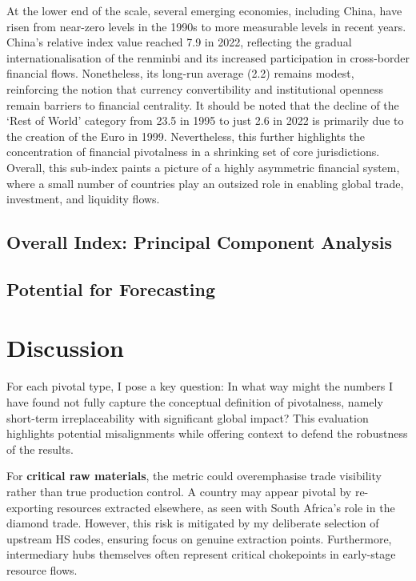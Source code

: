 \documentclass[11pt]{article}
\begin{document}
At the lower end of the scale, several emerging economies, including China, have risen from near-zero levels in the 1990s to more measurable levels in recent years. China’s relative index value reached 7.9 in 2022, reflecting the gradual internationalisation of the renminbi and its increased participation in cross-border financial flows. Nonetheless, its long-run average (2.2) remains modest, reinforcing the notion that currency convertibility and institutional openness remain barriers to financial centrality. It should be noted that the decline of the ‘Rest of World’ category from 23.5 in 1995 to just 2.6 in 2022 is primarily due to the creation of the Euro in 1999. Nevertheless, this further highlights the concentration of financial pivotalness in a shrinking set of core jurisdictions. Overall, this sub-index paints a picture of a highly asymmetric financial system, where a small number of countries play an outsized role in enabling global trade, investment, and liquidity flows.

\subsection{Overall Index: Principal Component Analysis}

\subsection{Potential for Forecasting}

\section{Discussion} 
\label{sec:evaluation}

For each pivotal type, I pose a key question: In what way might the numbers I have found not fully capture the conceptual definition of pivotalness, namely short-term irreplaceability with significant global impact? This evaluation highlights potential misalignments while offering context to defend the robustness of the results.

For \textbf{critical raw materials}, the metric could overemphasise trade visibility rather than true production control. A country may appear pivotal by re-exporting resources extracted elsewhere, as seen with South Africa’s role in the diamond trade. However, this risk is mitigated by my deliberate selection of upstream HS codes, ensuring focus on genuine extraction points. Furthermore, intermediary hubs themselves often represent critical chokepoints in early-stage resource flows.
\end{document}

